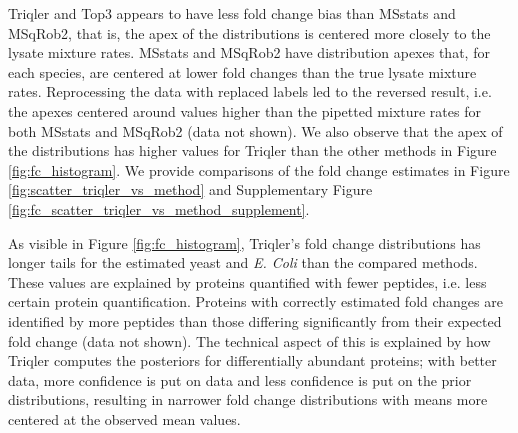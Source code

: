 \documentclass[10pt,letterpaper]{article}
\begin{document}
Triqler and Top3 appears to have less fold change bias than MSstats and MSqRob2, that is, the apex of the distributions is centered more closely to the lysate mixture rates. MSstats and MSqRob2 have distribution apexes that, for each species, are centered at lower fold changes than the true lysate mixture rates. Reprocessing the data with replaced labels led to the reversed result, i.e. the apexes centered around values higher than the pipetted mixture rates for both MSstats and MSqRob2 (data not shown). We also observe that the apex of the distributions has higher values for Triqler than the other methods in Figure \ref{fig:fc_histogram}. We provide comparisons of the fold change estimates in Figure \ref{fig:scatter_triqler_vs_method} and Supplementary Figure \ref{fig:fc_scatter_triqler_vs_method_supplement}.


As visible in Figure \ref{fig:fc_histogram}, Triqler's fold change distributions has longer tails for the estimated yeast and {\em E. Coli} than the compared methods. These values are explained by proteins quantified with fewer peptides, i.e. less certain protein quantification. Proteins with correctly estimated fold changes are identified by more peptides than those differing significantly from their expected fold change (data not shown). The technical aspect of this is explained by how Triqler computes the posteriors for differentially abundant proteins; with better data, more confidence is put on data and less confidence is put on the prior distributions, resulting in narrower fold change distributions with means more centered at the observed mean values. 
\end{document}
